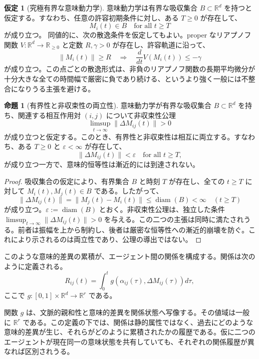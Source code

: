 \documentclass[11pt,a4paper]{article}
\theoremstyle{definition}
\newtheorem{proposition}{命題}[section]
\newtheorem{assumption}{仮定}[section]
\begin{document}
\begin{assumption}[究極有界な意味動力学]
意味動力学は有界な吸収集合 $B \subset \mathbb{R}^d$ を持つと仮定する。すなわち、任意の許容初期条件に対し、ある $T \geq 0$ が存在して、
\[
M_i(t) \in B \quad \text{for all } t \geq T
\]
が成り立つ。
同値的に、次の散逸条件を仮定してもよい。proper なリアプノフ関数
$V:\mathbb{R}^d\to\mathbb{R}_{\geq 0}$ と定数 $R,\gamma>0$ が存在し、許容軌道に沿って、
\[
\|M_i(t)\| \geq R \quad \Rightarrow \quad \frac{d}{dt}V(M_i(t)) \leq -\gamma
\]
が成り立つ。この点ごとの散逸形式は、非負のリアプノフ関数の長期平均微分が十分大きな全ての時間幅で厳密に負であり続ける、というより強く一般には不整合になりうる主張を避ける。
\end{assumption}

\begin{proposition}[有界性と非収束性の両立性]
意味動力学が有界な吸収集合 $B \subset \mathbb{R}^d$ を持ち、関連する相互作用対 $(i,j)$ について非収束性公理
\[
\limsup_{t\to\infty}\|\Delta M_{ij}(t)\| > 0
\]
が成り立つと仮定する。このとき、有界性と非収束性は相互に両立する。すなわち、ある $T \geq 0$ と $\varepsilon < \infty$ が存在して、
\[
\|\Delta M_{ij}(t)\| < \varepsilon
\quad \text{for all } t \geq T,
\]
が成り立つ一方で、意味的恒等性は漸近的には到達されない。
\end{proposition}

\begin{proof}
吸収集合の仮定により、有界集合 $B$ と時刻 $T$ が存在し、全ての $t\geq T$ に対して $M_i(t),M_j(t)\in B$ である。したがって、
\[
\|\Delta M_{ij}(t)\| = \|M_j(t)-M_i(t)\| \leq \operatorname{diam}(B) < \infty
\quad (t\geq T)
\]
が成り立つ。$\varepsilon:=\operatorname{diam}(B)$ とおく。非収束性公理は、独立した条件
$\limsup_{t\to\infty}\|\Delta M_{ij}(t)\|>0$ を与える。この二つの主張は同時に満たされうる。前者は振幅を上から制約し、後者は厳密な恒等性への漸近的崩壊を防ぐ。これにより示されるのは両立性であり、公理の導出ではない。
\end{proof}

このような意味的差異の累積が、エージェント間の関係を構成する。関係は次のように定義される。
\[
R_{ij}(t) = \int_0^t g(\alpha_{ij}(\tau), \Delta M_{ij}(\tau)) d\tau,
\]
ここで $g : [0, 1] \times \mathbb{R}^d \to \mathbb{R}^r$ である。

関数 $g$ は、文脈的親和性と意味的差異を関係状態へ写像する。その値域は一般に $\mathbb{R}^r$ である。この定義の下では、関係は静的属性ではなく、過去にどのような意味的差異が生じ、それらがどのように累積されたかの履歴である。仮に二つのエージェントが現在同一の意味状態を共有していても、それぞれの関係履歴が異なれば区別されうる。
\end{document}
